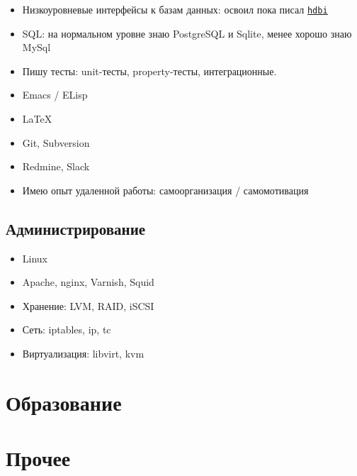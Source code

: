 \documentclass[11pt,a4paper,sans]{moderncv}        %
\newcommand*{\nlink}[2]{\textcolor{blue}{\texttt{\underline{\href{#1}{#2}}}}}
\begin{document}
\begin{itemize}
\item Низкоуровневые интерфейсы к базам данных: освоил пока писал
  \nlink{http://hackage.haskell.org/package/hdbi}{hdbi}
\item SQL: на нормальном уровне знаю PostgreSQL и Sqlite, менее хорошо
  знаю MySql
\item Пишу тесты: unit-тесты, property-тесты, интеграционные.
\item Emacs / ELisp
\item \LaTeX
\item Git, Subversion
\item Redmine, Slack
\item Имею опыт удаленной работы: самоорганизация / самомотивация
\end{itemize}

\subsection{Администрирование}

\begin{itemize}
\item Linux
\item Apache, nginx, Varnish, Squid
\item Хранение: LVM, RAID, iSCSI
\item Сеть: iptables, ip, tc
\item Виртуализация: libvirt, kvm
\end{itemize}

\section{Образование}


\enlargethispage{2em}

\section{Прочее}

\nocite{*}

\end{document}
